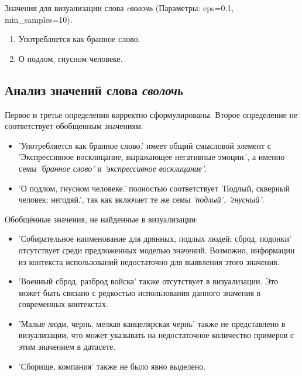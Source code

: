 Значения для визуализации слова \textit{cволочь} (Параметры: eps=0.1, min\_samples=10).

\begin{enumerate}
    \item Употребляется как бранное слово.
    \item О подлом, гнусном человеке.
\end{enumerate}

\subsection*{Анализ значений слова \textit{сволочь}}

Первое и третье определения корректно сформулированы.
Второе определение не соответствует обобщенным значениям.

\begin{itemize}
    \item ’Употребляется как бранное слово.’ имеет общий смысловой элемент с
’Экспрессивное восклицание, выражающее негативные эмоции.’,
а именно семы \textit{’бранное слово’} и \textit{’экспрессивное восклицание’}.

    \item ’О подлом, гнусном человеке.’ полностью соответствует
    ’Подлый, скверный человек; негодяй.’, так как включает те же семы \textit{’подлый’}, \textit{’гнусный’}.
\end{itemize}


Обобщённые значения, не найденные в визуализации:
\begin{itemize}
    \item ’Собирательное наименование для дрянных, подлых людей; сброд, подонки’ отсутствует среди предложенных моделью значений.
Возможно, информации из контекста использований недостаточно для выявления этого значения.

    \item ’Военный сброд, разброд войска’ также отсутствует в визуализации.
Это может быть связано с редкостью использования данного значения в современных контекстах.

    \item ’Малые люди, чернь, мелкая канцелярская чернь’ также не представлено в визуализации,
что может указывать на недостаточное количество примеров с этим значением в датасете.

    \item ’Сборище, компания’ также не было явно выделено.
\end{itemize}

